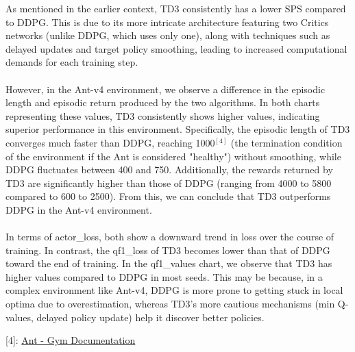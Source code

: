 \documentclass[english, a4paper,12pt]{article}
\begin{document}
\hspace*{5mm}As mentioned in the earlier context, TD3 consistently has a lower SPS compared to DDPG. This is due to its more intricate architecture featuring two Critics networks (unlike DDPG, which uses only one), along with techniques such as delayed updates and target policy smoothing, leading to increased computational demands for each training step.
\\
\vspace*{-2mm}
\\
\hspace*{5mm} However, in the Ant-v4 environment, we observe a difference in the episodic length and episodic return produced by the two algorithms. In both charts representing these values, TD3 consistently shows higher values, indicating superior performance in this environment. Specifically, the episodic length of TD3 converges much faster than DDPG, reaching 1000$^{[4]}$ (the termination condition of the environment if the Ant is considered "healthy") without smoothing, while DDPG fluctuates between 400 and 750. Additionally, the rewards returned by TD3 are significantly higher than those of DDPG (ranging from 4000 to 5800 compared to 600 to 2500). From this, we can conclude that TD3 outperforms DDPG in the Ant-v4 environment.
\\
\vspace*{-2mm}
\\
\hspace*{5mm} In terms of actor\_loss, both show a downward trend in loss over the course of training. In contrast, the qf1\_loss of TD3 becomes lower than that of DDPG toward the end of training. In the qf1\_values chart, we observe that TD3 has higher values compared to DDPG in most seeds. This may be because, in a complex environment like Ant-v4, DDPG is more prone to getting stuck in local optima due to overestimation, whereas TD3’s more cautious mechanisms (min Q-values, delayed policy update) help it discover better policies.
\begin{flushright}
\scriptsize [4]: \href{https://www.gymlibrary.dev/environments/mujoco/ant/}{Ant - Gym Documentation}
\end{flushright}
\newpage
\end{document}
